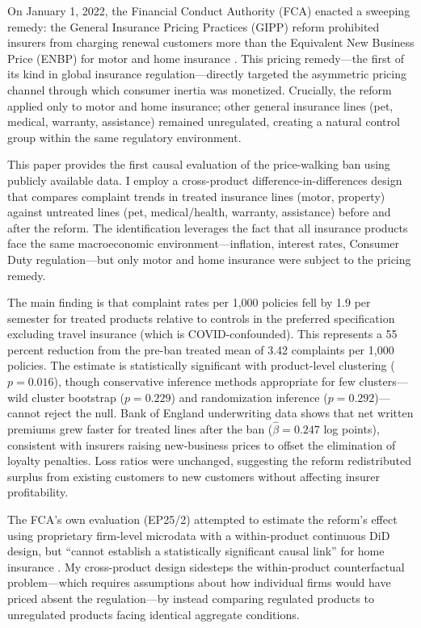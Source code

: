 \documentclass[12pt]{article}
\begin{document}
On January 1, 2022, the Financial Conduct Authority (FCA) enacted a sweeping remedy: the General Insurance Pricing Practices (GIPP) reform prohibited insurers from charging renewal customers more than the Equivalent New Business Price (ENBP) for motor and home insurance \citep{fca2021ps21}. This pricing remedy---the first of its kind in global insurance regulation---directly targeted the asymmetric pricing channel through which consumer inertia was monetized. Crucially, the reform applied only to motor and home insurance; other general insurance lines (pet, medical, warranty, assistance) remained unregulated, creating a natural control group within the same regulatory environment.

This paper provides the first causal evaluation of the price-walking ban using publicly available data. I employ a cross-product difference-in-differences design that compares complaint trends in treated insurance lines (motor, property) against untreated lines (pet, medical/health, warranty, assistance) before and after the reform. The identification leverages the fact that all insurance products face the same macroeconomic environment---inflation, interest rates, Consumer Duty regulation---but only motor and home insurance were subject to the pricing remedy.

The main finding is that complaint rates per 1,000 policies fell by 1.9 per semester for treated products relative to controls in the preferred specification excluding travel insurance (which is COVID-confounded). This represents a 55 percent reduction from the pre-ban treated mean of 3.42 complaints per 1,000 policies. The estimate is statistically significant with product-level clustering ($p = 0.016$), though conservative inference methods appropriate for few clusters---wild cluster bootstrap ($p = 0.229$) and randomization inference ($p = 0.292$)---cannot reject the null. Bank of England underwriting data shows that net written premiums grew faster for treated lines after the ban ($\hat{\beta} = 0.247$ log points), consistent with insurers raising new-business prices to offset the elimination of loyalty penalties. Loss ratios were unchanged, suggesting the reform redistributed surplus from existing customers to new customers without affecting insurer profitability.

The FCA's own evaluation (EP25/2) attempted to estimate the reform's effect using proprietary firm-level microdata with a within-product continuous DiD design, but ``cannot establish a statistically significant causal link'' for home insurance \citep{fca2025ep25}. My cross-product design sidesteps the within-product counterfactual problem---which requires assumptions about how individual firms would have priced absent the regulation---by instead comparing regulated products to unregulated products facing identical aggregate conditions.
\end{document}
